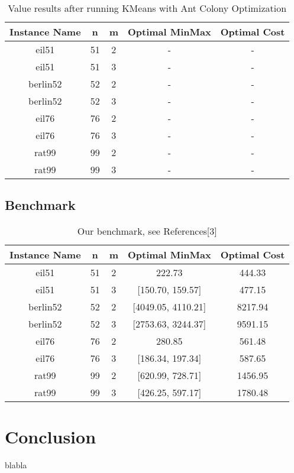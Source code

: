 \documentclass{article}
\begin{document}
\begin{table}[h!]
\centering
\begin{tabular}{ |c|c|c|c|c| } 
\hline
Instance Name & n & m & Optimal MinMax & Optimal Cost\\
\hline
eil51 & 51 & 2 & - & - \\ 
eil51 & 51 & 3 & - & - \\ 
berlin52 & 52 & 2 & - & - \\ 
berlin52 & 52 & 3 & - & - \\ 
eil76 & 76 & 2 & - & - \\ 
eil76 & 76 & 3 & - & - \\ 
rat99 & 99 & 2 & - & - \\ 
rat99 & 99 & 3 & - & - \\ 
\hline
\end{tabular}
\caption{Value results after running KMeans with Ant Colony Optimization}
\label{table:2}
\end{table}

\subsection{Benchmark}

\begin{table}[h!]
\centering
\begin{tabular}{ |c|c|c|c|c| } 
\hline
Instance Name & n & m & Optimal MinMax & Optimal Cost\\
\hline
eil51 & 51 & 2 & 222.73 & 444.33 \\ 
eil51 & 51 & 3 & [150.70, 159.57] & 477.15 \\ 
berlin52 & 52 & 2 & [4049.05, 4110.21] & 8217.94 \\ 
berlin52 & 52 & 3 & [2753.63, 3244.37] & 9591.15 \\ 
eil76 & 76 & 2 & 280.85 & 561.48 \\ 
eil76 & 76 & 3 & [186.34, 197.34] & 587.65 \\ 
rat99 & 99 & 2 & [620.99, 728.71] & 1456.95 \\ 
rat99 & 99 & 3 & [426.25, 597.17] & 1780.48  \\ 
\hline
\end{tabular}
\caption{Our benchmark, see References[3]}
\label{table:3}
\end{table}

\section{Conclusion}
blabla
\end{document}

